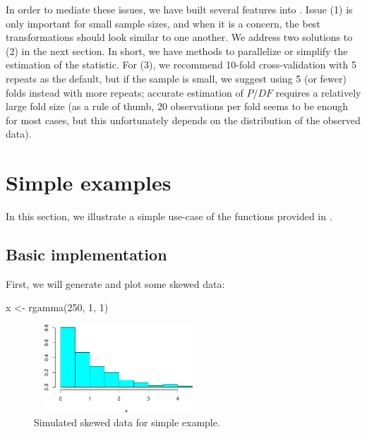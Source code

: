 In order to mediate these issues, we have built several features into
. Issue (1) is only important for small sample sizes,
and when it is a concern, the best transformations should look similar
to one another. We address two solutions to (2) in the next section. In
short, we have methods to parallelize or simplify the estimation of the
statistic. For (3), we recommend 10-fold cross-validation with 5 repeats
as the default, but if the sample is small, we suggest using 5 (or
fewer) folds instead with more repeats; accurate estimation of \(P/DF\)
requires a relatively large fold size (as a rule of thumb, 20
observations per fold seems to be enough for most cases, but this
unfortunately depends on the distribution of the observed data).

\hypertarget{simple-examples}{%
\section{Simple examples}\label{simple-examples}}

In this section, we illustrate a simple use-case of the functions
provided in .

\hypertarget{basic-implementation}{%
\subsection{Basic implementation}\label{basic-implementation}}

First, we will generate and plot some skewed data:

\begin{Schunk}
\begin{Sinput}
x <- rgamma(250, 1, 1)
\end{Sinput}
\end{Schunk}

\begin{Schunk}
\begin{figure}

{\centering \includegraphics[width=2.5in,height=1.3in]{figs/simple_hist-1} 

}

\caption[Simulated skewed data for simple example]{Simulated skewed data for simple example.}\label{fig:simple_hist}
\end{figure}
\end{Schunk}

